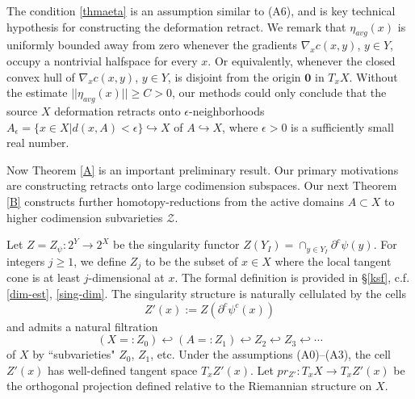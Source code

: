 \documentclass[12pt]{amsart}
\theoremstyle{definition}
\theoremstyle{remark}
\newcommand{\del}{\partial}
\newcommand{\sE}{\mathscr{E}}
\newcommand{\ysub}{\del^c \psi(y)}
\newcommand{\hh}{\hookleftarrow}
\newcommand{\sZ}{\mathscr{Z}}
\begin{document}
The condition \eqref{thmaeta} is an assumption similar to (A6), and is key technical hypothesis for constructing the deformation retract. We remark that $\eta_{avg}(x)$ is uniformly bounded away from zero whenever the gradients $\nabla_x c(x,y)$, $y\in Y$, occupy a nontrivial halfspace for every $x$. Or equivalently, whenever the closed convex hull of $\nabla_x c(x,y)$, $y\in Y$, is disjoint from the origin $\textbf{0}$ in $T_x X$. Without the estimate $||\eta_{avg}(x)||\geq C >0$, our methods could only conclude that the source $X$ deformation retracts onto $\epsilon$-neighborhoods $A_\epsilon=\{x\in X| d(x,A) <\epsilon\} \hookrightarrow X$ of $A\hookrightarrow X$, where $\epsilon>0$ is a sufficiently small real number. 

%





Now Theorem \ref{A} is an important preliminary result. Our primary motivations are constructing retracts onto large codimension subspaces. Our next Theorem \ref{B} constructs further homotopy-reductions from the active domains $A\subset X$ to higher codimension subvarieties $\sZ$.


Let $Z=Z_{\psi}: 2^Y \to 2^X$ be the singularity functor $Z(Y_I)=\cap_{y\in Y_I} \ysub$. For integers $j\geq 1$, we define $Z_j$ to be the subset of $x\in X$ where the local tangent cone is at least $j$-dimensional at $x$. The formal definition is provided in \S \ref{ksf}, c.f. \ref{dim-est}, \ref{sing-dim}. The singularity structure is naturally cellulated by the cells $$Z'(x):=Z(\del^c\psi^c(x))$$ and admits a natural filtration $$(X=:Z_0)\hh (A=:Z_1) \hh Z_2 \hh Z_3 \hh \cdots $$ of $X$ by ``subvarieties" $Z_0$, $Z_1$, etc. Under the assumptions (A0)--(A3), the cell $Z'(x)$ has well-defined tangent space $T_x Z'(x)$. Let $pr_{Z'}: T_x X \to T_x Z'(x)$ be the orthogonal projection defined relative to the Riemannian structure on $X$.  
\end{document}
